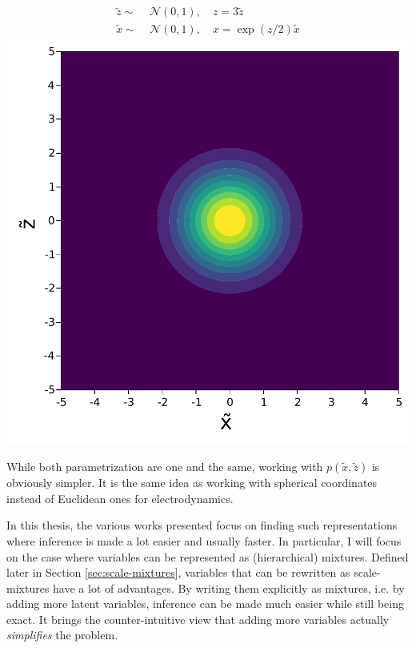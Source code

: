 \begin{minipage}{0.5\textwidth}
    \centering
    \begin{align}
        \begin{aligned}
            \tilde{z} \sim&\; \mathcal{N}(0, 1),\quad z = 3\tilde{z}\\
            \tilde{x} \sim&\; \mathcal{N}(0, 1),\quad x = \exp(z/2)\tilde{x}
        \end{aligned}
    \end{align}
    \includegraphics[width=\textwidth]{./chapters/1_introduction/figures/neals_funnel_non_centered.pdf}
    \label{fig:neals_centered}
\end{minipage}
\vspace{0.5cm}

While both parametrization are one and the same, working with $p(\tilde{x},\tilde{z})$ is obviously simpler.
It is the same idea as working with spherical coordinates instead of Euclidean ones for electrodynamics. 

In this thesis, the various works presented focus on finding such representations where inference is made a lot easier and usually faster.
In particular, I will focus on the case where variables can be represented as (hierarchical) mixtures.
Defined later in Section \ref{sec:scale-mixtures}, variables that can be rewritten as scale-mixtures have a lot of advantages.
By writing them explicitly as mixtures, i.e. by adding more latent variables, inference can be made much easier while still being exact.
It brings the counter-intuitive view that adding more variables actually \textit{simplifies} the problem.


